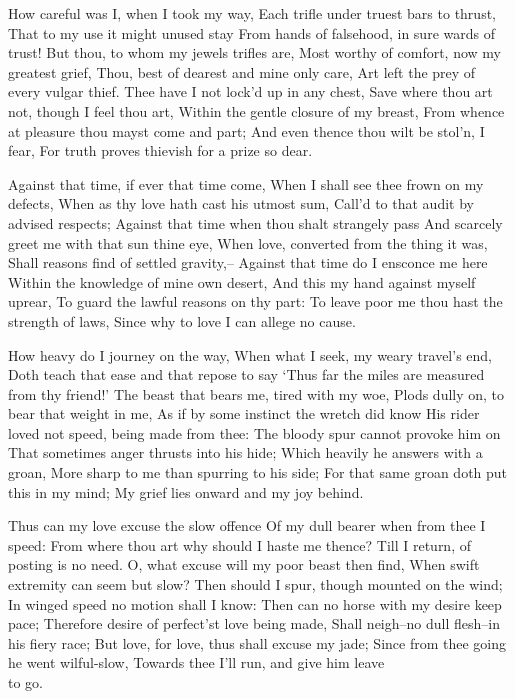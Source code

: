 \documentclass[twocolumn]{book}
\begin{document}
How careful was I, when I took my way,
Each trifle under truest bars to thrust,
That to my use it might unused stay
From hands of falsehood, in sure wards of trust!
But thou, to whom my jewels trifles are,
Most worthy of comfort, now my greatest grief,
Thou, best of dearest and mine only care,
Art left the prey of every vulgar thief.
Thee have I not lock'd up in any chest,
Save where thou art not, though I feel thou art,
Within the gentle closure of my breast,
From whence at pleasure thou mayst come and part;
  And even thence thou wilt be stol'n, I fear,
  For truth proves thievish for a prize so dear.


Against that time, if ever that time come,
When I shall see thee frown on my defects,
When as thy love hath cast his utmost sum,
Call'd to that audit by advised respects;
Against that time when thou shalt strangely pass
And scarcely greet me with that sun thine eye,
When love, converted from the thing it was,
Shall reasons find of settled gravity,--
Against that time do I ensconce me here
Within the knowledge of mine own desert,
And this my hand against myself uprear,
To guard the lawful reasons on thy part:
  To leave poor me thou hast the strength of laws,
  Since why to love I can allege no cause.


How heavy do I journey on the way,
When what I seek, my weary travel's end,
Doth teach that ease and that repose to say
`Thus far the miles are measured from thy friend!'
The beast that bears me, tired with my woe,
Plods dully on, to bear that weight in me,
As if by some instinct the wretch did know
His rider loved not speed, being made from thee:
The bloody spur cannot provoke him on
That sometimes anger thrusts into his hide;
Which heavily he answers with a groan,
More sharp to me than spurring to his side;
  For that same groan doth put this in my mind;
  My grief lies onward and my joy behind.


Thus can my love excuse the slow offence
Of my dull bearer when from thee I speed:
From where thou art why should I haste me thence?
Till I return, of posting is no need.
O, what excuse will my poor beast then find,
When swift extremity can seem but slow?
Then should I spur, though mounted on the wind;
In winged speed no motion shall I know:
Then can no horse with my desire keep pace;
Therefore desire of perfect'st love being made,
Shall neigh--no dull flesh--in his fiery race;
But love, for love, thus shall excuse my jade;
  Since from thee going he went wilful-slow,
  Towards thee I'll run, and give him leave\\ to go.
\end{document}
